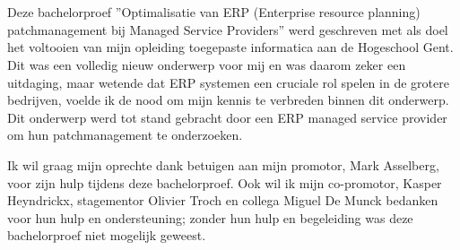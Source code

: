 
\chapter*{}%
\label{ch:voorwoord}



Deze bachelorproef ”Optimalisatie van ERP (Enterprise resource planning)
patchmanagement bij Managed Service Providers” werd geschreven met
als doel het voltooien van mijn opleiding toegepaste informatica aan de Hogeschool Gent.
Dit was een volledig nieuw onderwerp voor mij en was daarom zeker een uitdaging, maar wetende dat ERP systemen een cruciale rol spelen in de grotere bedrijven, voelde ik de nood om mijn kennis 
te verbreden binnen dit onderwerp. Dit onderwerp werd tot stand gebracht door een ERP managed service provider om hun patchmanagement te onderzoeken.

Ik wil graag mijn oprechte dank betuigen aan mijn promotor, Mark Asselberg, voor zijn hulp tijdens deze bachelorproef. Ook wil ik mijn co-promotor, Kasper Heyndrickx, stagementor Olivier 
Troch en collega Miguel De Munck bedanken voor hun hulp en ondersteuning; zonder hun hulp en begeleiding was deze bachelorproef niet mogelijk geweest.
